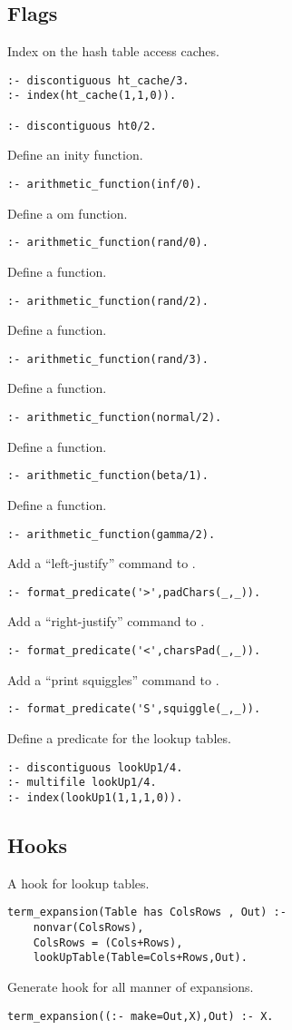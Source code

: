 \subsection{ Flags
}
Index on the hash table access caches.
\begin{Verbatim}
:- discontiguous ht_cache/3.
:- index(ht_cache(1,1,0)).

:- discontiguous ht0/2.
\end{Verbatim}
Define an inity function. 
\begin{Verbatim}
:- arithmetic_function(inf/0).
\end{Verbatim}
Define a om function.
\begin{Verbatim}
:- arithmetic_function(rand/0).
\end{Verbatim}
Define a  function.
\begin{Verbatim}
:- arithmetic_function(rand/2).
\end{Verbatim}
Define a  function.
\begin{Verbatim}
:- arithmetic_function(rand/3).
\end{Verbatim}
Define a  function.
\begin{Verbatim}
:- arithmetic_function(normal/2).
\end{Verbatim}
Define a  function.
\begin{Verbatim}
:- arithmetic_function(beta/1).
\end{Verbatim}
Define a  function.
\begin{Verbatim}
:- arithmetic_function(gamma/2).
\end{Verbatim}
Add a ``left-justify'' command to .
\begin{Verbatim}
:- format_predicate('>',padChars(_,_)).
\end{Verbatim}
Add a ``right-justify'' command to .
\begin{Verbatim}
:- format_predicate('<',charsPad(_,_)).
\end{Verbatim}
Add a ``print squiggles'' command to .
\begin{Verbatim}
:- format_predicate('S',squiggle(_,_)).
\end{Verbatim}
Define a predicate for the lookup tables.
\begin{Verbatim}
:- discontiguous lookUp1/4.
:- multifile lookUp1/4.
:- index(lookUp1(1,1,1,0)).
\end{Verbatim}
\subsection{ Hooks
}
A hook for lookup tables.
\begin{Verbatim}
term_expansion(Table has ColsRows , Out) :- 
    nonvar(ColsRows),
    ColsRows = (Cols+Rows),
    lookUpTable(Table=Cols+Rows,Out). 
\end{Verbatim}
Generate hook for all manner of expansions.
\begin{Verbatim}
term_expansion((:- make=Out,X),Out) :- X.
\end{Verbatim}
